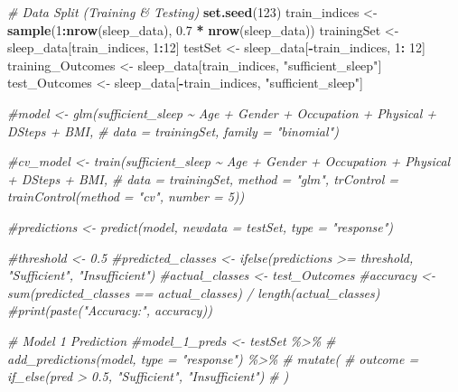 \documentclass[
  11pt,
]{article}
\newenvironment{Shaded}{\begin{snugshade}}{\end{snugshade}}
\newcommand{\CommentTok}[1]{\textcolor[rgb]{0.56,0.35,0.01}{\textit{#1}}}
\newcommand{\DecValTok}[1]{\textcolor[rgb]{0.00,0.00,0.81}{#1}}
\newcommand{\FloatTok}[1]{\textcolor[rgb]{0.00,0.00,0.81}{#1}}
\newcommand{\FunctionTok}[1]{\textcolor[rgb]{0.13,0.29,0.53}{\textbf{#1}}}
\newcommand{\NormalTok}[1]{#1}
\newcommand{\OtherTok}[1]{\textcolor[rgb]{0.56,0.35,0.01}{#1}}
\newcommand{\SpecialCharTok}[1]{\textcolor[rgb]{0.81,0.36,0.00}{\textbf{#1}}}
\newcommand{\StringTok}[1]{\textcolor[rgb]{0.31,0.60,0.02}{#1}}
\begin{document}
\begin{Shaded}
\begin{Highlighting}[]
\CommentTok{\# Data Split (Training \& Testing)}
\FunctionTok{set.seed}\NormalTok{(}\DecValTok{123}\NormalTok{)}
\NormalTok{train\_indices }\OtherTok{\textless{}{-}} \FunctionTok{sample}\NormalTok{(}\DecValTok{1}\SpecialCharTok{:}\FunctionTok{nrow}\NormalTok{(sleep\_data), }\FloatTok{0.7} \SpecialCharTok{*} \FunctionTok{nrow}\NormalTok{(sleep\_data)) }
\NormalTok{trainingSet }\OtherTok{\textless{}{-}}\NormalTok{ sleep\_data[train\_indices, }\DecValTok{1}\SpecialCharTok{:}\DecValTok{12}\NormalTok{]}
\NormalTok{testSet }\OtherTok{\textless{}{-}}\NormalTok{ sleep\_data[}\SpecialCharTok{{-}}\NormalTok{train\_indices, }\DecValTok{1}\SpecialCharTok{:} \DecValTok{12}\NormalTok{]}
\NormalTok{training\_Outcomes }\OtherTok{\textless{}{-}}\NormalTok{ sleep\_data[train\_indices, }\StringTok{"sufficient\_sleep"}\NormalTok{]}
\NormalTok{test\_Outcomes }\OtherTok{\textless{}{-}}\NormalTok{ sleep\_data[}\SpecialCharTok{{-}}\NormalTok{train\_indices, }\StringTok{"sufficient\_sleep"}\NormalTok{]}


\CommentTok{\#model \textless{}{-} glm(sufficient\_sleep \textasciitilde{} Age + Gender + Occupation + Physical + DSteps + BMI, }
\CommentTok{\#             data = trainingSet, family = "binomial")}

\CommentTok{\#cv\_model \textless{}{-} train(sufficient\_sleep \textasciitilde{} Age + Gender + Occupation + Physical + DSteps + BMI, }
\CommentTok{\#                  data = trainingSet, method = "glm", trControl = trainControl(method = "cv", number = 5))}


\CommentTok{\#predictions \textless{}{-} predict(model, newdata = testSet, type = "response")}

\CommentTok{\#threshold \textless{}{-} 0.5  }
\CommentTok{\#predicted\_classes \textless{}{-} ifelse(predictions \textgreater{}= threshold, "Sufficient", "Insufficient")}
\CommentTok{\#actual\_classes \textless{}{-} test\_Outcomes}
\CommentTok{\#accuracy \textless{}{-} sum(predicted\_classes == actual\_classes) / length(actual\_classes)}
\CommentTok{\#print(paste("Accuracy:", accuracy))}

\CommentTok{\# Model 1 Prediction}
\CommentTok{\#model\_1\_preds \textless{}{-} testSet \%\textgreater{}\%}
\CommentTok{\#  add\_predictions(model, type = "response") \%\textgreater{}\%}
\CommentTok{\#  mutate(}
\CommentTok{\#    outcome = if\_else(pred \textgreater{} 0.5, "Sufficient", "Insufficient")}
\CommentTok{\#  )}
\end{Highlighting}
\end{Shaded}
\end{document}
